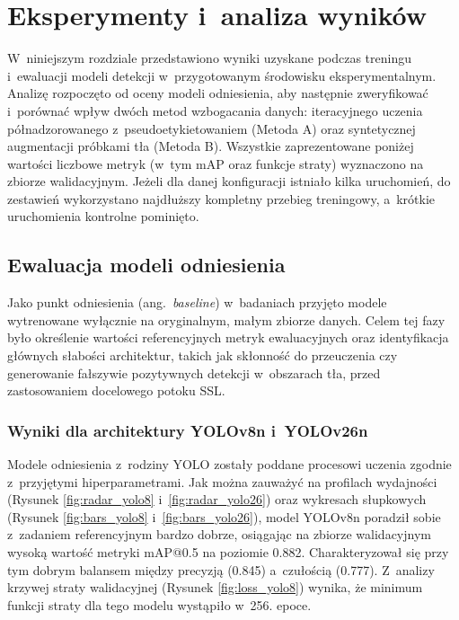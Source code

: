 \chapter{Eksperymenty i~analiza wyników}

W~niniejszym rozdziale przedstawiono wyniki uzyskane podczas treningu i~ewaluacji modeli detekcji w~przygotowanym środowisku eksperymentalnym. Analizę rozpoczęto od oceny modeli odniesienia, aby następnie zweryfikować i~porównać wpływ dwóch metod wzbogacania danych: iteracyjnego uczenia półnadzorowanego z~pseudoetykietowaniem (Metoda A) oraz syntetycznej augmentacji próbkami tła (Metoda B). Wszystkie zaprezentowane poniżej wartości liczbowe metryk (w~tym mAP oraz funkcje straty) wyznaczono na zbiorze walidacyjnym. Jeżeli dla danej konfiguracji istniało kilka uruchomień, do zestawień wykorzystano najdłuższy kompletny przebieg treningowy, a~krótkie uruchomienia kontrolne pominięto.

\section{Ewaluacja modeli odniesienia}

Jako punkt odniesienia (ang.\ \emph{baseline}) w~badaniach przyjęto modele wytrenowane wyłącznie na oryginalnym, małym zbiorze danych. Celem tej fazy było określenie wartości referencyjnych metryk ewaluacyjnych oraz identyfikacja głównych słabości architektur, takich jak skłonność do przeuczenia czy generowanie fałszywie pozytywnych detekcji w~obszarach tła, przed zastosowaniem docelowego potoku SSL.

\subsection{Wyniki dla architektury YOLOv8n i~YOLOv26n}

Modele odniesienia z~rodziny YOLO zostały poddane procesowi uczenia zgodnie z~przyjętymi hiperparametrami. Jak można zauważyć na profilach wydajności (Rysunek \ref{fig:radar_yolo8} i~\ref{fig:radar_yolo26}) oraz wykresach słupkowych (Rysunek \ref{fig:bars_yolo8} i~\ref{fig:bars_yolo26}), model YOLOv8n poradził sobie z~zadaniem referencyjnym bardzo dobrze, osiągając na zbiorze walidacyjnym wysoką wartość metryki mAP@0.5 na poziomie 0.882. Charakteryzował się przy tym dobrym balansem między precyzją (0.845) a~czułością (0.777). Z~analizy krzywej straty walidacyjnej (Rysunek \ref{fig:loss_yolo8}) wynika, że minimum funkcji straty dla tego modelu wystąpiło w~256. epoce.

